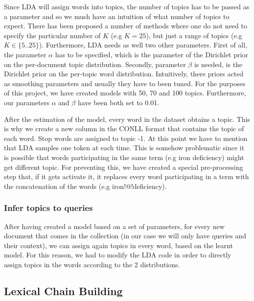 \documentclass[11pt, a4paper, abstraction]{scrartcl}
\begin{document}
Since LDA will assign words into topics, the number of topics has to be passed as a parameter and so we mush have an intuition of what number of topics to expect. There has been proposed a number of methods where one do not need to specify the  particular number of $K$ (e.g $K=25$), but just a range of topics (e.g $K \in\{5..25\}$). 
Furthermore, LDA needs as well two other parameters. First of all, the parameter $\alpha$ has to be specified, which is the parameter of the Dirichlet prior on the per-document topic distribution. Secondly, parameter $\beta$ is needed, is the Dirichlet prior on the per-topic word distribution. Intuitively, there priors acted as smoothing parameters and usually they have to been tuned.
For the purposes of this project, we have created models with 50, 70 and 100 topics. Furthermore, our parameters $\alpha$ and $\beta$ have been both set to 0.01. 

After the estimation of the model, every word in the dataset obtains a topic. This is why we create a new column in the CONLL format that contains the topic of each word. Stop words are assigned to topic -1.
At this point we have to mention that LDA samples one token at each time. This is somehow problematic since it is possible that words participating in the same term (e.g iron deficiency) might get different topic. For preventing this, we have created a special pre-processing step that, if it gets activate it, it replaces every word participating in a term with the concatenation of the words (e.g iron!@!deficiency).


\subsubsection{Infer topics to queries}
After having created a model based on a set of parameters, for every new document that comes in the collection (in our case we will only have queries and their context), we can assign again topics in every word, based on the learnt model.
For this reason, we had to modify the LDA code in order to directly assign topics in the words according to the 2 distributions. 


\subsection{Lexical Chain Building}
\end{document}
